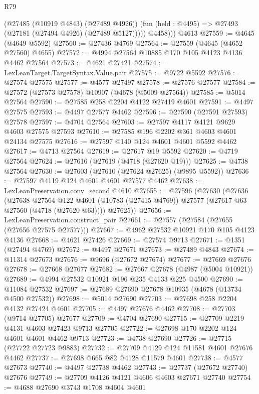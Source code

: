 \begin{lexlean}{R79}
\begin{coremodule}
            (@27485 (@10919 @4843) (@27489 @4926))
            (fun (held : @4495) => @27493 (@27181 (@27494 @4926) (@27489 @5127)))))
          @4458)))
    @4613
@27559 := @4645 (@4649 @5592)
@27560 := @27436 @4769
@27564 := @27559 (@4645 (@4652 @27560) @4655)
@27572 := @4994 @27564 @10885 @170 @105 @4123 @4136 @4462 @27564
@27573 := @4621 @27421
@27574 := LexLeanTarget.TargetSyntax.Value.pair
@27575 := @9722 @5592
@27576 := @27574 @27575
@27577 := @4577 @27497
@27578 := @27576 @27577
@27584 := @27572 (@27573 @27578) @10907 (@4678 (@5009 @27564))
@27585 := @5014 @27564
@27590 := @27585 @258 @2204 @4122 @27419 @4601
@27591 := @4497 @27575
@27593 := @4497 @27577 @4462
@27596 := @27590 (@27591 @27593) @27578
@27597 := @4704 @27564
@27603 := @27597 @4117 @4121 @9629 @4603 @27575 @27593
@27610 := @27585 @196 @2202 @361 @4603 @4601 @24134 @27575
@27616 := @27597 @140 @124 @4601 @4601 @5592 @4462
@27617 := @4713 @27564
@27619 := @27617 @19 @5592
@27620 := @4719 @27564
@27624 := @27616 (@27619 (@4718 (@27620 @19)))
@27625 := @4738 @27564
@27630 := @27603 (@27610 (@27624 @27625) (@9895 @5592))
@27636 := @27597 @4119 @124 @4601 @4601 @27577 @4462
@27638 := LexLeanPreservation.conv_second @4610
@27655 := @27596
    (@27630
      (@27636
        (@27638
          @27564
          @122
          @4601
          (@10783 (@27415 @4769))
          @27577
          (@27617 @63 @27560 (@4718 (@27620 @63))))
        @27625))
@27656 := LexLeanPreservation.construct_pair
@27661 := @27557 (@27584 (@27655 (@27656 @27575 @27577)))
@27667 := @4962 @27532 @10921 @170 @105 @4123 @4136
@27668 := @4621 @27426
@27669 := @27574 @9713
@27671 := @1351 (@27494 @4769)
@27672 := @4497 @27671
@27673 := @27489 @4843
@27674 := @11314 @27673
@27676 := @9696 (@27672 @27674)
@27677 := @27669 @27676
@27678 := @27668 @27677
@27682 := @27667 @27678 (@4987 (@5004 @10921))
@27689 := @4994 @27532 @10921 @196 @235 @4133 @225 @4500
@27690 := @11084 @27532
@27697 := @27689 @27690 @27678 @10935 (@4678 (@13734 @4500 @27532))
@27698 := @5014 @27690
@27703 := @27698 @258 @2204 @4132 @27424 @4601
@27705 := @4497 @27676 @4462
@27708 := @27703 (@9714 @27705) @27677
@27709 := @4704 @27690
@27715 := @27709 @2219 @4131 @4603 @27423 @9713 @27705
@27722 := @27698 @170 @2202 @124 @4601 @4601 @4462 @9713
@27723 := @4738 @27690
@27726 := @27715 (@27722 @27723 @9883)
@27732 := @27709 @4129 @124 @11581 @4601 @27676 @4462
@27737 := @27698 @665 @82 @4128 @11579 @4601
@27738 := @4577 @27673
@27740 := @4497 @27738 @4462
@27743 := @27737 (@27672 @27740) @27676
@27749 := @27709 @4126 @4121 @4606 @4603 @27671 @27740
@27754 := @4688 @27690 @3743 @1708 @4604 @4601

\end{coremodule}
\end{lexlean}
